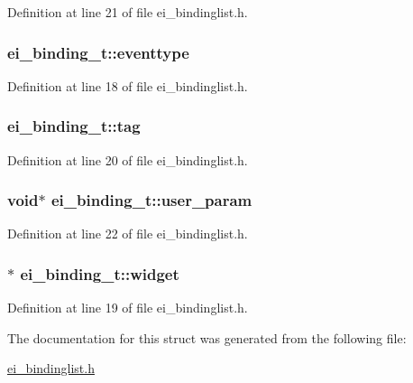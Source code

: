 Definition at line 21 of file ei\-\_\-bindinglist.\-h.

\hypertarget{structei__binding__t_ab27c15aa1ee61c51f132d0541bd8705a}{
\subsubsection[{eventtype}]{ ei\-\_\-binding\-\_\-t\-::eventtype}}\label{structei__binding__t_ab27c15aa1ee61c51f132d0541bd8705a}


Definition at line 18 of file ei\-\_\-bindinglist.\-h.

\hypertarget{structei__binding__t_acb3317b30d1a82f70ba51bb767aded9f}{
\subsubsection[{tag}]{ ei\-\_\-binding\-\_\-t\-::tag}}\label{structei__binding__t_acb3317b30d1a82f70ba51bb767aded9f}


Definition at line 20 of file ei\-\_\-bindinglist.\-h.

\hypertarget{structei__binding__t_a0f76dee050fdb325e77e2aad1b57b803}{
\subsubsection[{user\-\_\-param}]{\setlength{\rightskip}{0pt plus 5cm}void$\ast$ ei\-\_\-binding\-\_\-t\-::user\-\_\-param}}\label{structei__binding__t_a0f76dee050fdb325e77e2aad1b57b803}


Definition at line 22 of file ei\-\_\-bindinglist.\-h.

\hypertarget{structei__binding__t_ad3718306b2208e40f52e1da324040588}{
\subsubsection[{widget}]{$\ast$ ei\-\_\-binding\-\_\-t\-::widget}}\label{structei__binding__t_ad3718306b2208e40f52e1da324040588}


Definition at line 19 of file ei\-\_\-bindinglist.\-h.



The documentation for this struct was generated from the following file\-:\begin{DoxyCompactItemize}
\item 
\hyperlink{ei__bindinglist_8h}{ei\-\_\-bindinglist.\-h}\end{DoxyCompactItemize}
